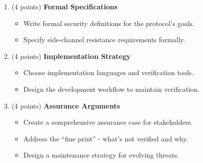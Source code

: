 \documentclass[10pt,a4paper,american]{article}
\begin{document}
\begin{enumerate}
\begin{enumerate}
		      \item (4 points) \textbf{Formal Specifications}
		            \begin{itemize}
			            \item Write formal security definitions for the protocol's goals.
			            \item Specify side-channel resistance requirements formally.
		            \end{itemize}

		      \item (4 points) \textbf{Implementation Strategy}
		            \begin{itemize}
			            \item Choose implementation languages and verification tools.
			            \item Design the development workflow to maintain verification.
		            \end{itemize}

		      \item (4 points) \textbf{Assurance Arguments}
		            \begin{itemize}
			            \item Create a comprehensive assurance case for stakeholders.
			            \item Address the ``fine print'' - what's not verified and why.
			            \item Design a maintenance strategy for evolving threats.
		            \end{itemize}
	      \end{enumerate}
\end{enumerate}
\end{document}
